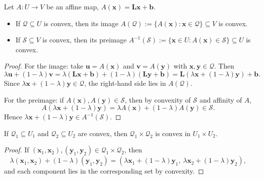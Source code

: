 \begin{claim}
\label{clm:affine-images-preimages}
Let $A:U\to V$ be an affine map, $A(\mathbf{x})=\mathbf{L}\mathbf{x}+\mathbf{b}$.
\begin{itemize}
  \item If $\mathcal{Q}\subseteq U$ is convex, then its image $A(\mathcal{Q}):=\{A(\mathbf{x}):\mathbf{x}\in\mathcal{Q}\}\subseteq V$
  is convex.
  \item If $\mathcal{S}\subseteq V$ is convex, then its preimage $A^{-1}(\mathcal{S}):=\{\mathbf{x}\in U:A(\mathbf{x})\in\mathcal{S}\}\subseteq U$
  is convex.
\end{itemize}
\end{claim}
\begin{proof}
For the image: take $\mathbf{u}=A(\mathbf{x})$ and $\mathbf{v}=A(\mathbf{y})$ with $\mathbf{x},\mathbf{y}\in\mathcal{Q}$.
Then
\[
  \lambda \mathbf{u}+(1-\lambda)\mathbf{v}
  =\lambda(\mathbf{L}\mathbf{x}+\mathbf{b})+(1-\lambda)(\mathbf{L}\mathbf{y}+\mathbf{b})
  =\mathbf{L}(\lambda\mathbf{x}+(1-\lambda)\mathbf{y})+\mathbf{b}.
\]
Since $\lambda\mathbf{x}+(1-\lambda)\mathbf{y}\in\mathcal{Q}$, the right-hand side lies in $A(\mathcal{Q})$.

For the preimage: if $A(\mathbf{x}),A(\mathbf{y})\in\mathcal{S}$, then by convexity of $\mathcal{S}$ and affinity of $A$,
\[
  A(\lambda\mathbf{x}+(1-\lambda)\mathbf{y})=\lambda A(\mathbf{x})+(1-\lambda)A(\mathbf{y})\in\mathcal{S}.
\]
Hence $\lambda\mathbf{x}+(1-\lambda)\mathbf{y}\in A^{-1}(\mathcal{S})$.
\end{proof}

\begin{claim}
If $\mathcal{Q}_1\subseteq U_1$ and $\mathcal{Q}_2\subseteq U_2$ are convex, then $\mathcal{Q}_1\times \mathcal{Q}_2$ is convex in
$U_1\times U_2$.
\end{claim}
\begin{proof}
If $(\mathbf{x}_1,\mathbf{x}_2),(\mathbf{y}_1,\mathbf{y}_2)\in\mathcal{Q}_1\times\mathcal{Q}_2$, then
\[
  \lambda(\mathbf{x}_1,\mathbf{x}_2)+(1-\lambda)(\mathbf{y}_1,\mathbf{y}_2)
  =(\lambda\mathbf{x}_1+(1-\lambda)\mathbf{y}_1,\ \lambda\mathbf{x}_2+(1-\lambda)\mathbf{y}_2),
\]
and each component lies in the corresponding set by convexity.
\end{proof}

